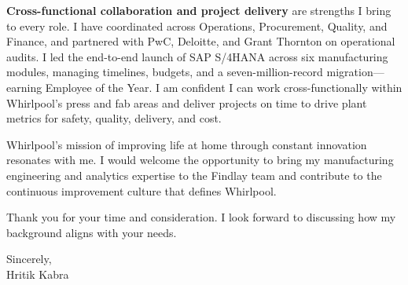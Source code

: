 \documentclass[letterpaper,11pt]{article}
\begin{document}
\textbf{Cross-functional collaboration and project delivery} are strengths I bring to every role. I have coordinated across Operations, Procurement, Quality, and Finance, and partnered with PwC, Deloitte, and Grant Thornton on operational audits. I led the end-to-end launch of SAP S/4HANA across six manufacturing modules, managing timelines, budgets, and a seven-million-record migration---earning Employee of the Year. I am confident I can work cross-functionally within Whirlpool's press and fab areas and deliver projects on time to drive plant metrics for safety, quality, delivery, and cost.

Whirlpool's mission of improving life at home through constant innovation resonates with me. I would welcome the opportunity to bring my manufacturing engineering and analytics expertise to the Findlay team and contribute to the continuous improvement culture that defines Whirlpool.

Thank you for your time and consideration. I look forward to discussing how my background aligns with your needs.

\vspace{14pt}
\noindent Sincerely, \\[4pt]
Hritik Kabra
\end{document}
